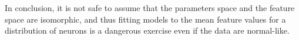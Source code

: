 
In conclusion, it is not safe to assume that the parameters space and the feature space are isomorphic, and thus fitting models to the mean feature values for a distribution of neurons is a dangerous exercise even if the data are normal-like.



